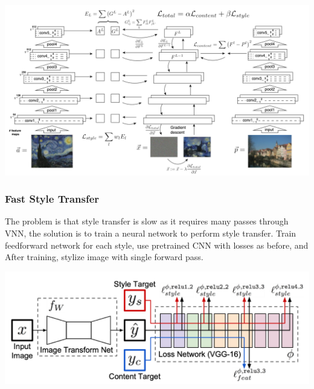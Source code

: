 \documentclass[11pt]{article}
\theoremstyle{definition}
\begin{document}
\begin{center}
	\includegraphics[width=0.8\linewidth]{img/conditional_GAN_style_representation.png}
\end{center}

\subsubsection{Fast Style Transfer}
The problem is that style transfer is slow as it requires many passes through VNN, the solution is to train a neural network to perform style transfer. Train feedforward network for each style, use pretrained CNN with losses as before, and After training, stylize image with single forward pass.
\begin{center}
	\includegraphics[width=0.7\linewidth]{img/fast_style_transfer}
\end{center}
\end{document}
